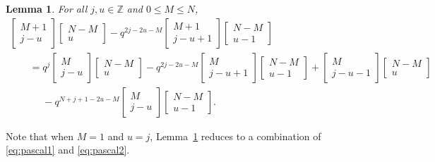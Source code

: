 \documentclass[pdftex]{sigma}
\numberwithin{equation}{section}
\newtheorem{Lemma}[Theorem]{Lemma}
\newcommand{\field}[1]{\mathbb{#1}}
\newcommand{\Z}{\field{Z}}
\begin{document}
\begin{Lemma}
\label{lem:tech2}
For all $j,u \in \Z$ and $0\leq M\leq N$,
\begin{gather*}
\begin{bmatrix}
M+1\\
j-u
\end{bmatrix} \begin{bmatrix}
N-M\\
u
\end{bmatrix}-q^{2j-2u-M}\begin{bmatrix}
M+1\\
j-u+1
\end{bmatrix} \begin{bmatrix}
N-M\\
u-1
\end{bmatrix}\\
\qquad
=q^j \begin{bmatrix}
M\\
j-u
\end{bmatrix} \begin{bmatrix}
N-M\\
u
\end{bmatrix}
- q^{2j-2u-M}\begin{bmatrix}
M\\
j-u+1
\end{bmatrix} \begin{bmatrix}
N-M\\
u-1
\end{bmatrix}+\begin{bmatrix}
M\\
j-u-1
\end{bmatrix} \begin{bmatrix}
N-M\\
u
\end{bmatrix}\\
\phantom{\qquad=}{}- q^{N+j+1-2u-M} \begin{bmatrix}
M\\
j-u
\end{bmatrix} \begin{bmatrix}
N-M\\
u-1
\end{bmatrix}.
\end{gather*}
\end{Lemma}

Note that when $M=1$ and $u=j$, Lemma~\ref{lem:tech2} reduces to a combination of \eqref{eq:pascal1} and \eqref{eq:pascal2}.
\end{document}
